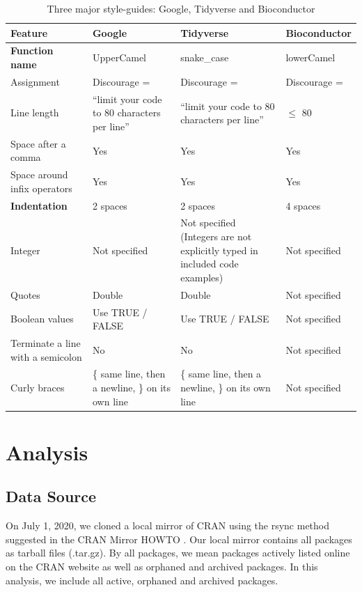 \begin{table}

\caption{\label{tab:table1}Three major style-guides: Google, Tidyverse and Bioconductor}
\centering
\begin{tabular}[t]{L|L|L|L}
\hline
Feature & Google & Tidyverse & Bioconductor\\
\hline
\textbf{Function name} & UpperCamel & snake\_case & lowerCamel\\
\hline
Assignment & Discourage = & Discourage = & Discourage =\\
\hline
Line length & “limit your code to 80 characters per line” & “limit your code to 80 characters per line” & $\leqslant$ 80\\
\hline
Space after a comma & Yes & Yes & Yes\\
\hline
Space around infix operators & Yes & Yes & Yes\\
\hline
\textbf{Indentation} & 2 spaces & 2 spaces & 4 spaces\\
\hline
Integer & Not specified & Not specified (Integers are not explicitly typed in included code examples) & Not specified\\
\hline
Quotes & Double & Double & Not specified\\
\hline
Boolean values & Use TRUE / FALSE & Use TRUE / FALSE & Not specified\\
\hline
Terminate a line with a semicolon & No & No & Not specified\\
\hline
Curly braces & \{ same line, then a newline, \} on its own line & \{ same line, then a newline, \} on its own line & Not specified\\
\hline
\end{tabular}
\end{table}


\section{Analysis}
\subsection{Data Source}

On July 1, 2020, we cloned a local mirror of CRAN using the rsync method suggested in the CRAN Mirror HOWTO \citep{cranminihowto}. Our local mirror contains all packages as tarball files (.tar.gz). By all packages, we mean packages actively listed online on the CRAN website as well as orphaned and archived packages. In this analysis, we include all active, orphaned and archived packages.


